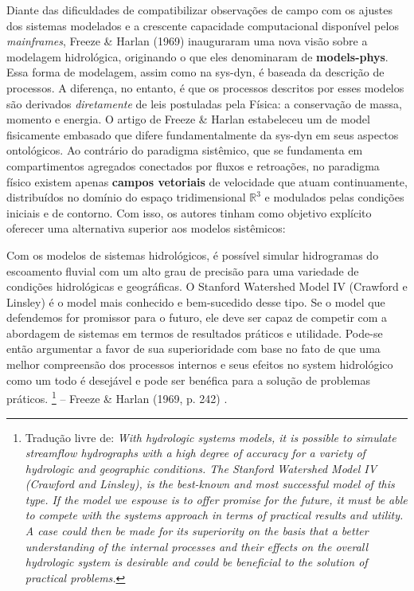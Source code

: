 \documentclass[./main.tex]{subfiles}
\begin{document}
\par Diante das dificuldades de compatibilizar observações de campo com os ajustes dos sistemas modelados e a crescente capacidade computacional disponível pelos \textit{mainframes}, Freeze \& Harlan (1969) inauguraram uma nova visão sobre a modelagem hidrológica, originando o que eles denominaram de \textbf{\gls{models-phys}}. Essa forma de modelagem, assim como na \gls{sys-dyn}, é baseada da descrição de processos. A diferença, no entanto, é que os processos descritos por esses modelos são derivados \textit{diretamente} de leis postuladas pela Física: a conservação de massa, momento e energia. O artigo de Freeze \& Harlan estabeleceu um  de \gls{model} fisicamente embasado que difere fundamentalmente da \gls{sys-dyn} em seus aspectos ontológicos. Ao contrário do \gls{paradigma} sistêmico, que se fundamenta em compartimentos agregados conectados por fluxos e retroações, no \gls{paradigma} físico existem apenas \textbf{campos vetoriais} de velocidade que atuam continuamente, distribuídos no domínio do espaço tridimensional $\mathbb{R}^3$ e modulados pelas condições iniciais e de contorno. Com isso, os autores tinham como objetivo explícito oferecer uma alternativa superior aos modelos sistêmicos:
\begin{adjustwidth}{100pt}{0pt}
\medskip
\small
Com os modelos de sistemas hidrológicos, é possível simular hidrogramas do escoamento fluvial com um alto grau de precisão para uma variedade de condições hidrológicas e geográficas. O Stanford Watershed Model IV (Crawford e Linsley) é o \gls{model} mais conhecido e bem-sucedido desse tipo. Se o \gls{model} que defendemos for promissor para o futuro, ele deve ser capaz de competir com a abordagem de sistemas em termos de resultados práticos e utilidade. Pode-se então argumentar a favor de sua superioridade com base no fato de que uma melhor compreensão dos processos internos e seus efeitos no \gls{system} hidrológico como um todo é desejável e pode ser benéfica para a solução de problemas práticos.
\footnote{Tradução livre de: 
\textit{
With hydrologic systems models, it is possible to simulate streamflow hydrographs with a high degree of accuracy for a variety of hydrologic and geographic conditions. The Stanford Watershed Model IV (Crawford and Linsley), is the best-known and most successful model of this type. If the model we espouse is to offer promise for the future, it must be able to compete with the systems approach in terms of practical results and utility. A case could then be made for its superiority on the basis that a better understanding of the internal processes and their effects on the overall hydrologic system is desirable and could be beneficial to the solution of practical problems.
}} -- Freeze \& Harlan (1969, p. 242) \cite{Freeze1969a}.
\medskip
\end{adjustwidth}
\end{document}
